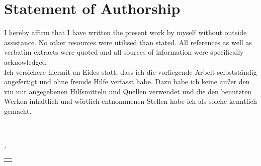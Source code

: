 

\chapter*{Statement of Authorship} %

\thispagestyle{empty}

\noindent I hereby affirm that I have written the present work by myself without outside assistance. No other resources were utilised than stated. All references as well as verbatim extracts were quoted and all sources of information were specifically acknowledged.\\

\noindent Ich versichere hiermit an Eides statt, dass ich die vorliegende Arbeit selbstst\"andig angefertigt und ohne fremde Hilfe verfasst habe. Dazu habe ich keine au{\ss}er den vin mir angegebenen Hilfsmitteln und Quellen verwendet und die den benutzten Werken inhaltlich und w\"ortlich entnommenen Stellen habe ich als solche kenntlich gemacht.

\
\bigskip
 
\noindent\textit{\myLocation, \myTime}

\smallskip

\begin{flushright}
\begin{tabular}{m{5cm}}
\\ \hline
\centering\myName \\
\end{tabular}
\end{flushright}
